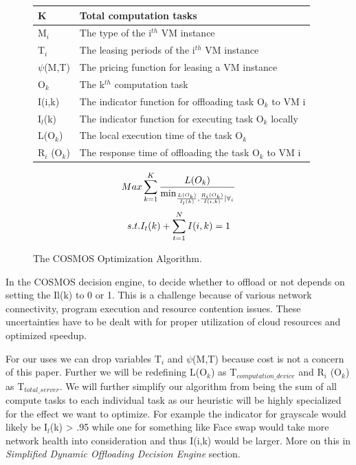 \documentclass{sig-alternate}
\begin{document}
\begin{figure}[H]
\begin{tabular}{ | m{5em} | m{5cm}| } 
\hline
K & \tiny Total computation tasks \\
\hline
M$_{i}$    & \tiny The type of the i$^{th}$ VM instance \\
\hline
T$_{i}$    & \tiny The leasing periods of  the i$^{th}$ VM instance \\
\hline
$\psi$(M,T)    & \tiny The pricing function for leasing a VM instance \\
\hline
O$_{k}$  & \tiny The k$^{th}$ computation task \\
\hline
I(i,k)   & \tiny The indicator function for offloading task O$_{k}$ to VM i   \\
\hline
I$_{l}$(k) & \tiny The indicator function for executing task O$_{k}$ locally  \\
\hline
L(O$_{k}$) & \tiny The local execution time of the task  O$_{k}$\\
\hline
R$_{i}$ (O$_{k}$) & \tiny The response time of offloading the task O$_{k}$ to VM i  \\ 
\hline
\end{tabular}
\begin{equation} 
 Max  \space \sum_{k = 1}^{K} \frac{L({O_{k}})}{\min_{ \frac{L({O_{k}})}{I_l(k)}, \frac{R_i({O_{k}})}{I(i,k)} |\forall_{i}}}
\end{equation}
\begin{equation}
  s.t. \space I_{t}(k) +\sum_{t = 1}^{N} I(i,k) = 1
\end{equation}

\caption{The COSMOS Optimization Algorithm.}
\end{figure}

In the COSMOS decision engine, to decide whether to offload or not depends on setting the Il(k) to 0 or 1. This is a challenge because of various network connectivity, program execution and resource contention issues. These uncertainties have to be dealt with for proper utilization of cloud resources and optimized speedup. \cite{cosmos}

For our uses we can drop variables T$_{i}$ and $\psi$(M,T) because cost is not a concern of this paper. Further we  will be redefining L(O$_{k}$) as T$_{computation\_device}$ and R$_{i}$ (O$_{k}$) as T$_{total\_server}$. We will further simplify our algorithm from being the sum of all compute tasks to each individual task as our heuristic will be highly specialized for the effect we want to optimize. For example the indicator for grayscale would likely be I$_{l}$(k) > .95 while one for something like Face swap would take more network health into consideration and thus I(i,k)  would be larger. More on this in \textit{Simplified Dynamic Offloading Decision Engine} section.
\end{document}
